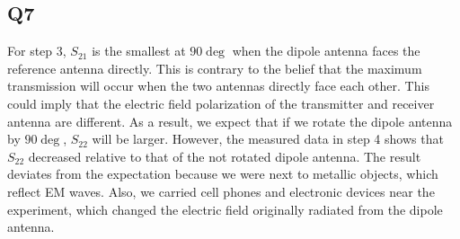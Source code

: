 \documentclass{article} %
\begin{document}
\subsection*{Q7}
For step 3, $S_{21}$ is the smallest at $90 \deg$ when the dipole antenna faces the reference antenna directly. This is contrary to the belief that the maximum transmission will occur when the two antennas directly face each other. This could imply that the electric field polarization of the transmitter and receiver antenna are different.
As a result, we expect that if we rotate the dipole antenna by $90 \deg$, $S_{22}$ will be larger. However, the measured data in step 4 shows that $S_{22}$ decreased relative to that of the not rotated dipole antenna. The result deviates from the expectation because we were next to metallic objects, which reflect EM waves. Also, we carried cell phones and electronic devices near the experiment, which changed the electric field originally radiated from the dipole antenna.
\end{document}
